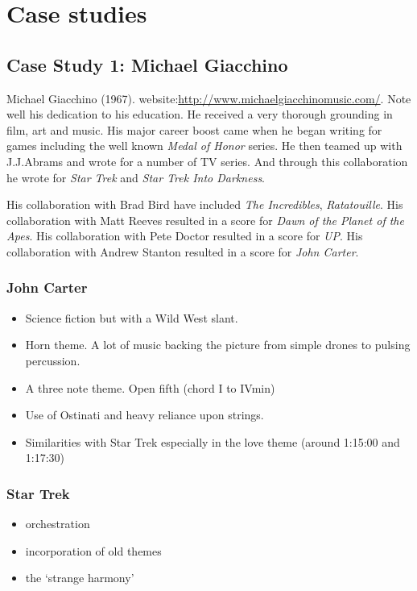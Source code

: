 
\chapter{Case studies}
\label{casestudies}

\section{Case Study 1: Michael Giacchino}

Michael Giacchino (1967). website:\url{http://www.michaelgiacchinomusic.com/}. Note well his dedication to his education. He received a very thorough grounding in film, art and music. His major career boost came when he began writing for games including the well known \textit{Medal of Honor} series. He then teamed up with J.J.Abrams and wrote for a number of TV series. And through this collaboration he wrote for \textit{Star Trek} and \textit{Star Trek Into Darkness}.

His collaboration with Brad Bird have included \textit{The Incredibles}, \textit{Ratatouille}. His collaboration with Matt Reeves resulted in a score for \textit{Dawn of the Planet of the Apes}. His collaboration with Pete Doctor resulted in a score for \textit{UP}. His collaboration with Andrew Stanton resulted in a score for \textit{John Carter}.

\subsection{John Carter}
\begin{itemize}
\item Science fiction but with a Wild West slant.   
\item Horn theme. A lot of music backing the picture from simple drones to pulsing percussion.  
\item A three note theme. Open fifth (chord I to IVmin)
\item Use of Ostinati and heavy reliance upon strings.
\item Similarities with Star Trek especially in the love theme (around 1:15:00 and 1:17:30)
\end{itemize}

\subsection{Star Trek}
\begin{itemize}
\item orchestration
\item incorporation of old themes
\item the `strange harmony'
\end{itemize}

